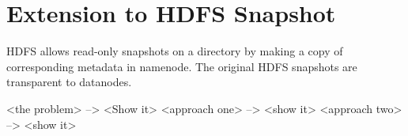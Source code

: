 \section{Extension to HDFS Snapshot}

HDFS allows read-only snapshots on a directory by making a copy of corresponding metadata in namenode. The original HDFS snapshots are transparent to datanodes.

<the problem> --> <Show it>
<approach one> --> <show it>
<approach two> --> <show it>
